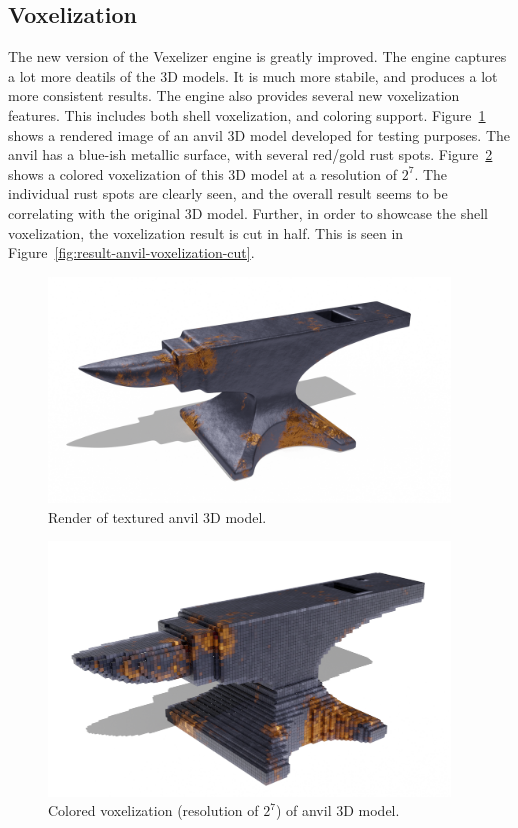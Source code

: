 \subsection{Voxelization}
The new version of the Vexelizer engine is greatly improved. The engine captures a lot more deatils of the 3D models. It is much more stabile, and produces a lot more consistent results. The engine also provides several new voxelization features. This includes both shell voxelization, and coloring support. Figure~\ref{fig:anvil-render} shows a rendered image of an anvil 3D model developed for testing purposes. The anvil has a blue-ish metallic surface, with several red/gold rust spots. Figure~\ref{fig:result-anvil-voxelization} shows a colored voxelization of this 3D model at a resolution of $2^7$. The individual rust spots are clearly seen, and the overall result seems to be correlating with the original 3D model. Further, in order to showcase the shell voxelization, the voxelization result is cut in half. This is seen in Figure~\ref{fig:result-anvil-voxelization-cut}.
\begin{figure}[htp]
    \centering
    \includegraphics[width=0.95\textwidth]{sections/result/figures/anvil-color-render.png}
    \caption{Render of textured anvil 3D model.}
    \label{fig:anvil-render}
\end{figure}
\begin{figure}[htp]
    \centering
    \includegraphics[width=0.95\textwidth]{sections/result/figures/anvil-voxelized-v1-color-128.png}
    \caption{Colored voxelization (resolution of $2^7$) of anvil 3D model.}
    \label{fig:result-anvil-voxelization}
\end{figure}
